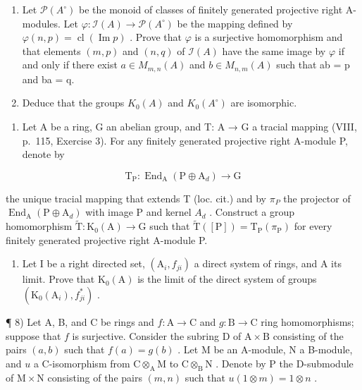 \begin{enumerate}
\def\labelenumi{\alph{enumi})}
\item
  Let \(\mathcal{P}(A^{\circ})\) be the monoid of classes of finitely generated projective right A-modules. Let \(\varphi: \mathcal{I}(A) \to \mathcal{P}(A^{\circ})\) be the mapping defined by \(\varphi(n,p) = \operatorname{cl}(\operatorname{Im}p)\) . Prove that \(\varphi\) is a surjective homomorphism and that elements \((m,p)\) and \((n,q)\) of \(\mathcal{I}(A)\) have the same image by \(\varphi\) if and only if there exist \(a \in M_{m,n}(A)\) and \(b \in M_{n,m}(A)\) such that ab = p and ba = q.
\item
  Deduce that the groups \(K_{0}(A)\) and \(K_{0}(A^{\circ})\) are isomorphic.
\end{enumerate}

\begin{enumerate}
\def\labelenumi{\arabic{enumi})}
\setcounter{enumi}{5}
\tightlist
\item
  Let A be a ring, G an abelian group, and T: A → G a tracial mapping (VIII, p.~115, Exercise 3). For any finitely generated projective right A-module P, denote by
\end{enumerate}

\[
\mathrm{T} _ {\mathrm{P}}: \operatorname{End} _ {\mathrm{A}} (\mathrm{P} \oplus \mathrm{A} _ {d}) \longrightarrow \mathrm{G}
\]

the unique tracial mapping that extends T (loc. cit.) and by \(\pi_{P}\) the projector of \(\operatorname{End}_{\mathrm{A}}(\mathrm{P} \oplus \mathrm{A}_{d})\) with image P and kernel \(A_{d}\) . Construct a group homomorphism \(\widetilde{\mathrm{T}} : \mathrm{K}_{0}(\mathrm{A}) \to \mathrm{G}\) such that \(\widetilde{\mathrm{T}}([\mathrm{P}]) = \mathrm{T}_{\mathrm{P}}(\pi_{\mathrm{P}})\) for every finitely generated projective right A-module P.

\begin{enumerate}
\def\labelenumi{\arabic{enumi})}
\setcounter{enumi}{6}
\tightlist
\item
  Let I be a right directed set, \((\mathrm{A}_{i}, f_{ji})\) a direct system of rings, and A its limit. Prove that \(\mathrm{K}_{0}(\mathrm{A})\) is the limit of the direct system of groups \((\mathrm{K}_{0}(\mathrm{A}_{i}), f_{ji}^{*})\) .
\end{enumerate}

¶ 8) Let A, B, and C be rings and \(f: \mathrm{A} \to \mathrm{C}\) and \(g: \mathrm{B} \to \mathrm{C}\) ring homomorphisms; suppose that \(f\) is surjective. Consider the subring D of \(\mathrm{A} \times \mathrm{B}\) consisting of the pairs \((a, b)\) such that \(f(a) = g(b)\) . Let M be an A-module, N a B-module, and \(u\) a C-isomorphism from \(\mathrm{C} \otimes_{\mathrm{A}} \mathrm{M}\) to \(\mathrm{C} \otimes_{\mathrm{B}} \mathrm{N}\) . Denote by P the D-submodule of \(\mathrm{M} \times \mathrm{N}\) consisting of the pairs \((m, n)\) such that \(u(1 \otimes m) = 1 \otimes n\) .

